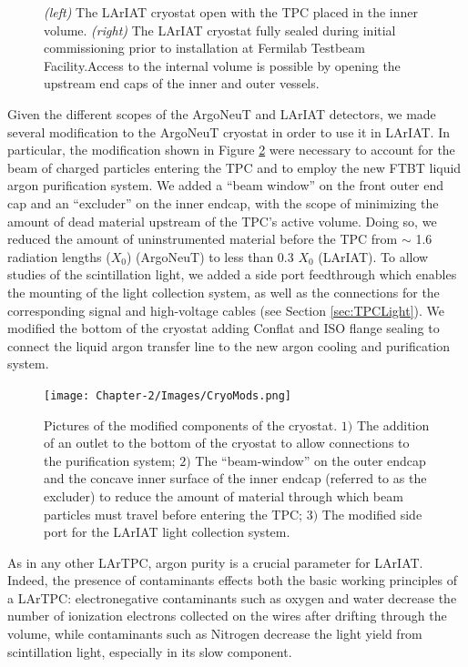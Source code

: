 \begin{figure}[htb]
\caption{\emph{(left)} The LArIAT cryostat open with the TPC placed in the inner volume. \emph{(right)} The LArIAT cryostat fully sealed during initial commissioning prior to installation at Fermilab Testbeam Facility.Access to the internal volume is possible by opening the upstream end caps of the inner and outer vessels. }
\label{fig:LArIATCryoStat}
\end{figure}

Given the different scopes of the ArgoNeuT and LArIAT detectors, we made several modification to the ArgoNeuT cryostat in order to use it in LArIAT. In particular, the modification  shown in Figure \ref{fig:LArIATCryoMods} were necessary to account for the beam of charged particles entering the TPC and to employ the new FTBT liquid argon purification system. 
We added a ``beam window'' on the front outer end cap and an ``excluder'' on the inner endcap, with the scope of minimizing the amount of dead material upstream of the TPC's active volume.  Doing so, we reduced the amount of uninstrumented material before the TPC from $\sim$ 1.6 radiation lengths ($X_{0}$) (ArgoNeuT) to less than 0.3 $X_{0}$ (LArIAT). To allow studies of the scintillation light, we added a side port feedthrough which enables the mounting of the light collection system, as well as the connections for the corresponding signal and high-voltage cables (see Section \ref{sec:TPCLight}).  We modified the bottom of the cryostat adding Conflat and ISO flange sealing to connect the liquid argon transfer line to the new argon cooling and purification system.



\begin{figure}[htb]
\centering
\texttt{[image: Chapter-2/Images/CryoMods.png]}
\caption{Pictures of the modified components of the cryostat. $1)$ The addition of an outlet to the bottom of the cryostat to allow connections to the purification system; $2)$ The ``beam-window'' on the outer endcap and the concave inner surface of the inner endcap (referred to as the excluder) to reduce the amount of material through which beam particles must travel before entering the TPC; $3)$ The modified side port for the LArIAT light collection system.}
\label{fig:LArIATCryoMods}
\end{figure}

As in any other LArTPC, argon purity is a crucial parameter for LArIAT. Indeed, the presence of contaminants effects both the basic working principles of a LArTPC: electronegative contaminants such as oxygen and water decrease the number of ionization electrons collected on the wires after drifting through the volume, while contaminants such as Nitrogen decrease the light yield from scintillation light, especially in its slow component.

